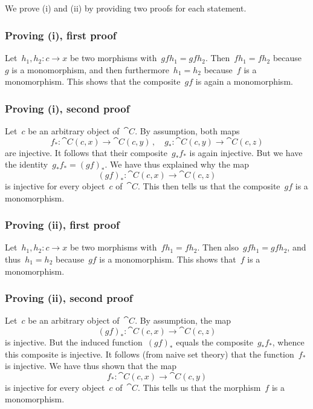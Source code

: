 \subsection{}

We prove (i) and (ii) by providing two proofs for each statement.



\subsubsection*{Proving (i), first proof}

Let~$h_1, h_2 \colon c \to x$ be two morphisms with~$gf h_1 = gf h_2$.
Then~$f h_1 = f h_2$ because~$g$ is a monomorphism, and then furthermore~$h_1 = h_2$ because~$f$ is a monomorphism.
This shows that the composite~$g f$ is again a monomorphism.



\subsubsection*{Proving (i), second proof}

Let~$c$ be an arbitrary object of~$\cat{C}$.
By assumption, both maps
\[
	f_* \colon \cat{C}(c, x) \to \cat{C}(c, y) \,,
	\quad
	g_* \colon \cat{C}(c, y) \to \cat{C}(c, z)
\]
are injective.
It follows that their composite~$g_* f_*$ is again injective.
But we have the identity~$g_* f_* = (g f)_*$.
We have thus explained why the map
\[
	(g f)_* \colon \cat{C}(c, x) \to \cat{C}(c, z)
\]
is injective for every object~$c$ of~$\cat{C}$.
This then tells us that the composite~$g f$ is a monomorphism.



\subsubsection*{Proving (ii), first proof}

Let~$h_1, h_2 \colon c \to x$ be two morphisms with~$f h_1 = f h_2$.
Then also~$g f h_1 = g f h_2$, and thus~$h_1 = h_2$ because~$g f$ is a monomorphism.
This shows that~$f$ is a monomorphism.



\subsubsection*{Proving (ii), second proof}

Let~$c$ be an arbitrary object of~$\cat{C}$.
By assumption, the map
\[
	(g f)_* \colon \cat{C}(c, x) \to \cat{C}(c, z)
\]
is injective.
But the induced function~$(g f)_*$ equals the composite~$g_* f_*$, whence this composite is injective.
It follows (from naive set theory) that the function~$f_*$ is injective.
We have thus shown that the map
\[
	f_* \colon \cat{C}(c, x) \to \cat{C}(c, y)
\]
is injective for every object~$c$ of~$\cat{C}$.
This tells us that the morphism~$f$ is a monomorphism.



